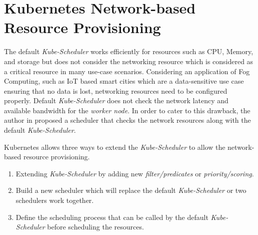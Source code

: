   \section{Kubernetes Network-based Resource Provisioning}
  \label{sec:k8s_ns}
  The default \emph{Kube-Scheduler} works efficiently for resources such as CPU, Memory, and storage but does not consider the networking resource which is considered as a critical resource in many use-case scenarios\cite{Santos2019}. Considering an application of Fog Computing, such as IoT based smart cities which are a data-sensitive use case ensuring that no data is lost, networking resources need to be configured properly\cite{Santos2019}. Default \emph{Kube-Scheduler} does not check the network latency and available bandwidth for the \emph{worker node}. In order to cater to this drawback, the author in \cite{Santos2019} proposed a scheduler that checks the network resources along with the default \emph{Kube-Scheduler}\cite{Santos2019}. \par
  Kubernetes allows three ways to extend the \emph{Kube-Scheduler} to allow the network-based resource provisioning\cite{k8s}.
  \begin{enumerate}
    \item Extending \emph{Kube-Scheduler} by adding new \emph{filter/predicates} or \emph{priority/scoring}.
    \item Build a new scheduler which will replace the default \emph{Kube-Scheduler} or two schedulers work together.
    \item Define the scheduling process that can be called by the default \emph{Kube-Scheduler} before scheduling the resources.
  \end{enumerate}
